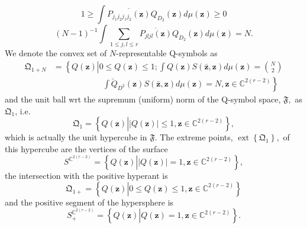 \documentclass[aps,preprint]{revtex4}%
\begin{document}
\begin{equation}
1\geq\int\overline{P_{j_{1}j_{2}j_{1}j_{2}}\left(  \mathbf{z}\right)
}Q_{D_{2}}\left(  \mathbf{z}\right)  d\mu\left(  \mathbf{z}\right)  \geq0
\end{equation}%
\begin{equation}
\left(  N-1\right)  ^{-1}\int\sum_{1\leq j,l\leq r}\overline{P_{jljl}\left(
\mathbf{z}\right)  }Q_{D_{2}}\left(  \mathbf{z}\right)  d\mu\left(
\mathbf{z}\right)  =N.
\end{equation}
We denote the convex set of $N$-representable Q-symbols as
\begin{align}
\mathfrak{Q}_{1+N}  &  =\left\{  Q\left(  \mathbf{z}\right)  \left\vert 0\leq
Q\left(  \mathbf{z}\right)  \leq1;\int Q\left(  \mathbf{z}\right)  S\left(
\mathbf{\bar{z},z}\right)  d\mu\left(  \mathbf{z}\right)  =\binom{N}%
{2}\right.  \right. \nonumber\\
&  \qquad\qquad\qquad\left.  \int\breve{Q}_{D^{2}}\left(  \mathbf{z}\right)
S\left(  \mathbf{\bar{z},z}\right)  d\mu\left(  \mathbf{z}\right)
=N,\mathbf{z\in}\mathbb{C}^{2\left(  r-2\right)  }\right\}
\end{align}
and the unit ball wrt the supremum (uniform) norm of the Q-symbol space,
$\mathfrak{F},$ as $\mathfrak{Q}_{1}$, i.e.
\begin{equation}
\mathfrak{Q}_{1}=\left\{  Q\left(  \mathbf{z}\right)  \left\vert \left\vert
Q\left(  \mathbf{z}\right)  \right\vert \leq1,\mathbf{z\in}\mathbb{C}%
^{2\left(  r-2\right)  }\right.  \right\}  ,
\end{equation}
which is actually the unit hypercube in $\mathfrak{F}$. The extreme points,
$\operatorname*{ext}\left\{  \mathfrak{Q}_{1}\right\}  ,$ of this hypercube
are the vertices of the surface
\begin{equation}
S^{\mathbb{C}^{2\left(  r-2\right)  }}=\left\{  Q\left(  \mathbf{z}\right)
\left\vert \left\vert Q\left(  \mathbf{z}\right)  \right\vert =1,\mathbf{z\in
}\mathbb{C}^{2\left(  r-2\right)  }\right.  \right\}  ,
\end{equation}
the intersection with the positive hyperant is
\begin{equation}
\mathfrak{Q}_{1+}=\left\{  Q\left(  \mathbf{z}\right)  \left\vert 0\leq
Q\left(  \mathbf{z}\right)  \leq1,\mathbf{z\in}\mathbb{C}^{2\left(
r-2\right)  }\right.  \right\}
\end{equation}
and the positive segment of the hypersphere is
\begin{equation}
S_{+}^{\mathbb{C}^{2\left(  r-2\right)  }}=\left\{  Q\left(  \mathbf{z}%
\right)  \left\vert Q\left(  \mathbf{z}\right)  =1,\mathbf{z\in}%
\mathbb{C}^{2\left(  r-2\right)  }\right.  \right\}  .
\end{equation}
\end{document}
